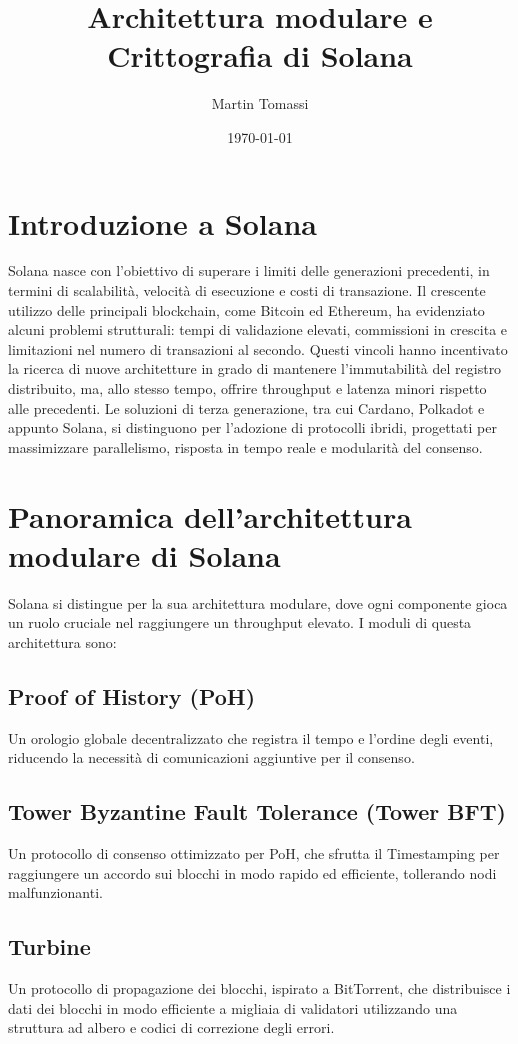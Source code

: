 \documentclass[a4paper,12pt]{report}
\title{Architettura modulare e Crittografia di Solana}
\author{Martin Tomassi}
\date{\today}
\begin{document}
	\maketitle
	\tableofcontents
	
	\chapter{Introduzione a Solana}
	Solana nasce con l’obiettivo di superare i limiti delle generazioni precedenti, in termini di scalabilità, velocità di esecuzione e costi di transazione. Il crescente utilizzo delle principali blockchain, come Bitcoin ed Ethereum, ha evidenziato alcuni problemi strutturali: tempi di validazione elevati, commissioni in crescita e limitazioni nel numero di transazioni al secondo. Questi vincoli hanno incentivato la ricerca di nuove architetture in grado di mantenere l’immutabilità del registro distribuito, ma, allo stesso tempo, offrire throughput e latenza minori rispetto alle precedenti. Le soluzioni di terza generazione, tra cui Cardano, Polkadot e appunto Solana, si distinguono per l’adozione di protocolli ibridi, progettati per massimizzare parallelismo, risposta in tempo reale e modularità del consenso.
	
	\chapter{Panoramica dell'architettura modulare di Solana}
	
	Solana si distingue per la sua architettura modulare, dove ogni componente gioca un ruolo cruciale nel raggiungere un throughput elevato. I moduli di questa architettura sono:
	
	\section{Proof of History (PoH)}
	Un orologio globale decentralizzato che registra il tempo e l'ordine degli eventi, riducendo la necessità di comunicazioni aggiuntive per il consenso.
	
	\section{Tower Byzantine Fault Tolerance (Tower BFT)}
	Un protocollo di consenso ottimizzato per PoH, che sfrutta il Timestamping per raggiungere un accordo sui blocchi in modo rapido ed efficiente, tollerando nodi malfunzionanti.
	
	\section{Turbine}
	Un protocollo di propagazione dei blocchi, ispirato a BitTorrent, che distribuisce i dati dei blocchi in modo efficiente a migliaia di validatori utilizzando una struttura ad albero e codici di correzione degli errori.
	
\end{document}
